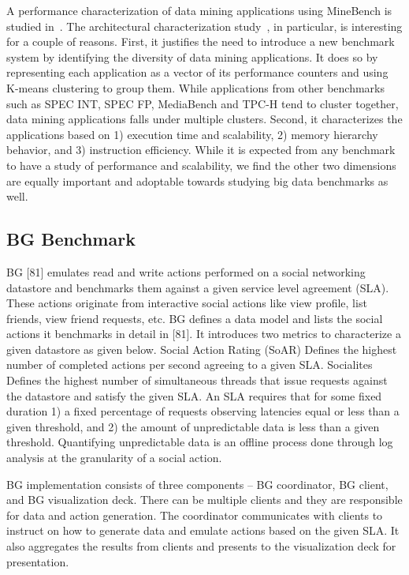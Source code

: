A performance characterization of data mining applications using MineBench is studied in~\cite{minebench,minebench2}. The architectural characterization study~\cite{minebench2}, in particular, is interesting for a couple of reasons. First, it justifies the need to introduce a new benchmark system by identifying the diversity of data mining applications. It does so by representing each application as a vector of its performance counters and using K-means clustering to group them. While applications from other benchmarks such as SPEC INT, SPEC FP, MediaBench and TPC-H tend to cluster together, data mining applications falls under multiple clusters. Second, it characterizes the applications based on 1) execution time and scalability, 2) memory hierarchy behavior, and 3) instruction efficiency. While it is expected from any benchmark to have a study of performance and scalability, we find the other two dimensions are equally important and adoptable towards studying big data benchmarks as well.

\subsection{BG Benchmark}
BG [81] emulates read and write actions performed on a social networking datastore and benchmarks them against a given service level agreement (SLA). These actions originate from interactive social actions like view profile, list friends, view friend requests, etc. BG defines a data model and lists the social actions it benchmarks in detail in [81]. It introduces two metrics to characterize a given datastore as given below.
	Social Action Rating (SoAR)
Defines the highest number of completed actions per second agreeing to a given SLA.
	Socialites
Defines the highest number of simultaneous threads that issue requests against the datastore and satisfy the given SLA.
An SLA requires that for some fixed duration 1) a fixed percentage of requests observing latencies equal or less than a given threshold, and 2) the amount of unpredictable data is less than a given threshold. Quantifying unpredictable data is an offline process done through log analysis at the granularity of a social action. 

BG implementation consists of three components – BG coordinator, BG client, and BG visualization deck. There can be multiple clients and they are responsible for data and action generation. The coordinator communicates with clients to instruct on how to generate data and emulate actions based on the given SLA. It also aggregates the results from clients and presents to the visualization deck for presentation.

